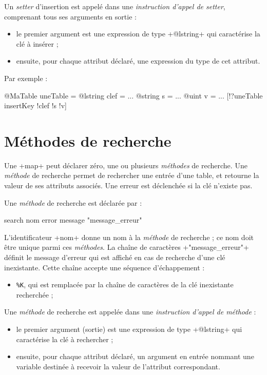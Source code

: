 Un \emph{setter} d'insertion est appelé dans une \emph{instruction d'appel de setter}, comprenant tous ses arguments en sortie :
\begin{itemize}
  \item le premier argument est une expression de type \ggs+@lstring+ qui caractérise la clé à insérer ;
  \item ensuite, pour chaque attribut déclaré, une expression du type de cet attribut.
\end{itemize}

Par exemple :
\begin{galgascode}
@MaTable uneTable = {}
@lstring clef = ...
@string s = ...
@uint v = ...
[!?uneTable insertKey !clef !s !v]
\end{galgascode}











\section{Méthodes de recherche}

Une \ggs+map+ peut déclarer zéro, une ou plusieurs \emph{méthodes} de recherche. Une \emph{méthode} de recherche permet de rechercher une entrée d'une table, et retourne la valeur de ses attributs associés. Une erreur est déclenchée si la clé n'existe pas.


Une \emph{méthode} de recherche est déclarée par :


\begin{galgascode}
search nom error message "message_erreur"
\end{galgascode}

L'identificateur \ggs+nom+ donne un nom à la \emph{méthode} de recherche ; ce nom doit être unique parmi ces \emph{méthodes}. La chaîne de caractères \ggs+"message_erreur"+ définit le message d'erreur qui est affiché en cas de recherche d'une clé inexistante. Cette chaîne accepte une séquence d'échappement :
\begin{itemize}
  \item \texttt{\%K}, qui est remplacée par la chaîne de caractères de la clé inexistante recherchée ;
\end{itemize}


Une \emph{méthode} de recherche est appelée dans une \emph{instruction d'appel de méthode} :
\begin{itemize}
  \item le premier argument (sortie) est une expression de type \ggs+@lstring+ qui caractérise la clé à rechercher ;
  \item ensuite, pour chaque attribut déclaré, un argument en entrée nommant une variable destinée à recevoir la valeur de l'attribut correspondant.
\end{itemize}

